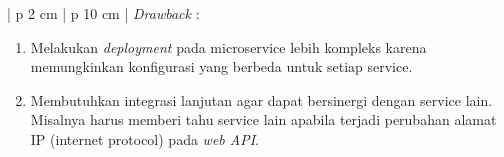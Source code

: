 \begin{enumerate}[leftmargin=*]
\begin{table}[H]
\begin{adjustbox}{width=1\textwidth}
\begin{tabular}{| p {2 cm} | p {10 cm} |}
				\textit{Drawback} : 
				\begin{enumerate}[leftmargin=*]
					\item Melakukan \textit{deployment} pada microservice lebih kompleks karena memungkinkan konfigurasi yang berbeda untuk setiap service.
					\item Membutuhkan integrasi lanjutan agar dapat bersinergi dengan service lain. Misalnya harus memberi tahu service lain apabila terjadi perubahan alamat IP (internet protocol) pada \textit{web API}.
				\end{enumerate}\\
				\hline
			\end{tabular}
		\end{adjustbox}
	\end{table}
\end{enumerate}
\newpage